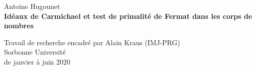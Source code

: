 \begin{center}
	\large Antoine Hugounet \\

	\vspace{25px}
	\LARGE \textbf{Idéaux de Carmichael et test de primalité de Fermat dans les corps de nombres}

	\vspace{25px}
	\large
	Travail de recherche encadré par Alain Kraus (IMJ-PRG) \\
	Sorbonne Université \\
	de janvier à juin 2020 \\

	\vspace{1cm}
	\begin{center}
	\end{center}

	\normalsize
	\renewcommand{\contentsname}{}
	\vspace{10px}
	\tableofcontents
\end{center}
